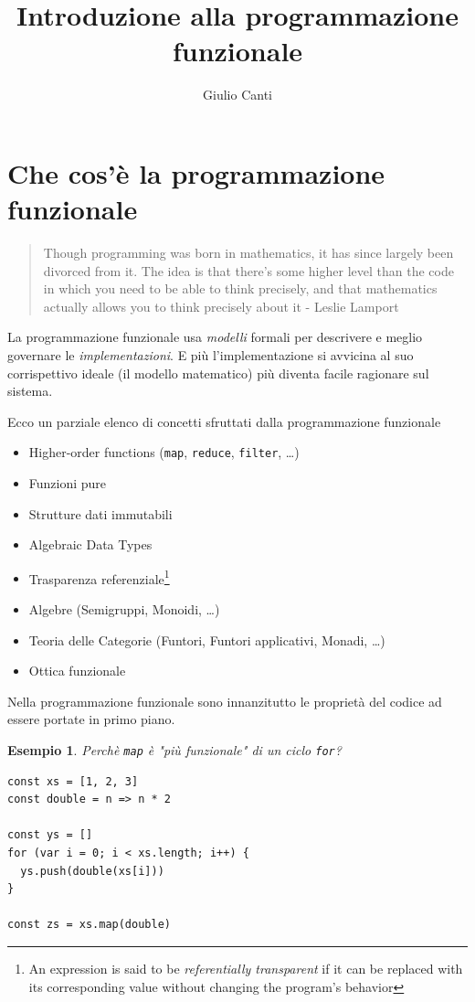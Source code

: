 \documentclass[12pt]{article}
\title{
  Introduzione alla programmazione funzionale
}
\author{Giulio Canti}
\newtheorem{example}{Esempio}[section]
\begin{document}
\maketitle

\tableofcontents

\newpage

\section{Che cos'è la programmazione funzionale}

\begin{quote}
Though programming was born in mathematics, it has since largely been divorced from it.
The idea is that there's some higher level than the code in which you need to be able to think precisely,
and that mathematics actually allows you to think precisely about it - Leslie Lamport
\end{quote}

La programmazione funzionale usa \emph{modelli} formali per descrivere e meglio governare le \emph{implementazioni}.
E più l'implementazione si avvicina al suo corrispettivo ideale (il modello matematico)
più diventa facile ragionare sul sistema.

Ecco un parziale elenco di concetti sfruttati dalla programmazione funzionale

\begin{itemize}
  \item Higher-order functions (\texttt{map}, \texttt{reduce}, \texttt{filter},  \ldots)
  \item Funzioni pure
  \item Strutture dati immutabili
  \item Algebraic Data Types
  \item Trasparenza referenziale\footnote{An expression is said to be \emph{referentially transparent} if it can be replaced with its corresponding value without changing the program's behavior}
  \item Algebre (Semigruppi, Monoidi, \ldots)
  \item Teoria delle Categorie (Funtori, Funtori applicativi, Monadi, \ldots)
  \item Ottica funzionale
\end{itemize}

Nella programmazione funzionale sono innanzitutto le proprietà del codice ad essere portate in primo piano.

\begin{example}
Perchè \texttt{map} è "più funzionale" di un ciclo \texttt{for}?

\begin{verbatim}
const xs = [1, 2, 3]
const double = n => n * 2

const ys = []
for (var i = 0; i < xs.length; i++) {
  ys.push(double(xs[i]))
}

const zs = xs.map(double)
\end{verbatim}

\end{example}
\end{document}
